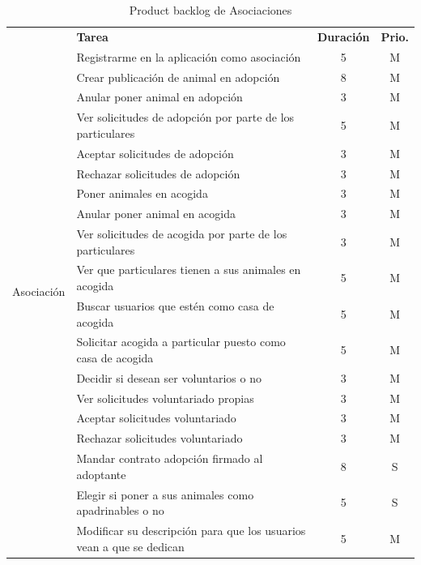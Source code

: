 \begin{table}[H]
	\centering
	\begin{tabular}{|c |p{8cm}|c |c|} \hline 
		\multirow[c]{25}{*}{Asociación}&  \textbf{Tarea}&  \textbf{Duración}& \textbf{Prio.}\\  \cline{2-4}
		
		&  Registrarme en la aplicación como asociación&  5& M\\ \cline{2-4} 
		&  Crear publicación de animal en adopción&  8& M\\ \cline{2-4} 
		&  Anular poner animal en adopción&  3& M\\ \cline{2-4} 
		&  Ver solicitudes de adopción por parte de los particulares&  5& M\\ \cline{2-4}
		&  Aceptar solicitudes de adopción&  3& M\\ \cline{2-4}
		&  Rechazar solicitudes de adopción&  3& M\\ \cline{2-4}
		
		
		&  Poner animales en acogida&  3& M\\ \cline{2-4}
		&  Anular poner animal en acogida&  3& M\\ \cline{2-4} 
		&  Ver solicitudes de acogida por parte de los particulares&  3& M\\ \cline{2-4}
		
		&  Ver que particulares tienen a sus animales en acogida&  5& M\\ \cline{2-4}
		&  Buscar usuarios que estén como casa de acogida&  5& M\\ \cline{2-4}
		&  Solicitar acogida a particular puesto como casa de acogida &  5& M\\ \cline{2-4}
		
		
		&  Decidir si desean ser voluntarios o no&  3& M\\ \cline{2-4}
		&  Ver solicitudes voluntariado propias&  3& M\\ \cline{2-4}
		&  Aceptar solicitudes voluntariado&  3& M\\ \cline{2-4}
		&  Rechazar solicitudes voluntariado&  3& M\\ \cline{2-4}
		
		&  Mandar contrato adopción firmado al adoptante&  8& S\\ \cline{2-4}
		
		&  Elegir si poner a sus animales como apadrinables o no &  5& S\\ \cline{2-4}
		
		&  Modificar su descripción para que los usuarios vean a que se dedican & 5 & M \\ \hline
		
		
		
		
	\end{tabular}
	\caption{Product backlog de Asociaciones}
	\label{tab:pb_asociaciones}
\end{table}


